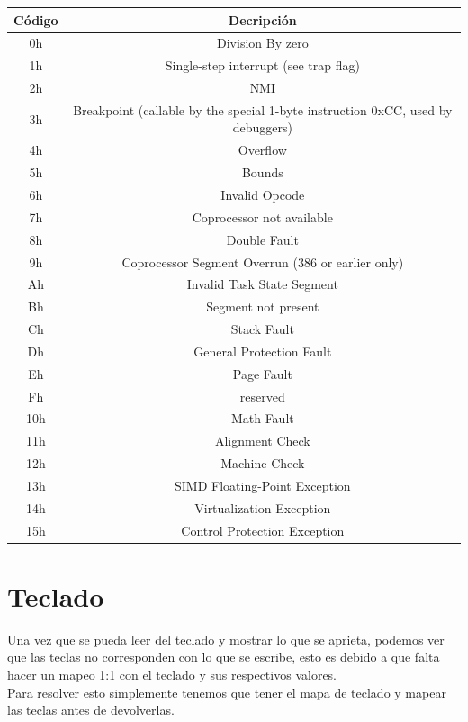 \documentclass[]{article}
\begin{document}
\begin{center}
	\begin{tabular}{ |c|c| }
		\hline
		C\'odigo & Decripci\'on\\
		\hline
		0h & Division By zero\\
		1h & Single-step interrupt (see trap flag) \\
		2h & NMI\\
		3h & Breakpoint (callable by the special 1-byte instruction 0xCC, used by debuggers) \\
		4h & Overflow\\
		5h & Bounds\\
		6h & Invalid Opcode \\
		7h & Coprocessor not available \\
		8h & Double Fault\\
		9h & Coprocessor Segment Overrun (386 or earlier only) \\
		Ah & Invalid Task State Segment \\
		Bh & Segment not present \\
		Ch & Stack Fault \\
		Dh & General Protection Fault\\
		Eh & Page Fault\\
		Fh & reserved\\
		10h & Math Fault \\
		11h & Alignment Check \\
		12h & Machine Check \\
		13h & SIMD Floating-Point Exception \\
		14h & Virtualization Exception \\
		15h & Control Protection Exception \\
		\hline
	\end{tabular}
\end{center}

\section*{Teclado}
Una vez que se pueda leer del teclado y mostrar lo que se aprieta, podemos ver que las teclas
no corresponden con lo que se escribe, esto es debido a que falta hacer un mapeo 1:1 con el teclado y sus respectivos valores. \\

Para resolver esto simplemente tenemos que tener el mapa de teclado y mapear las teclas antes de devolverlas.
\end{document}
